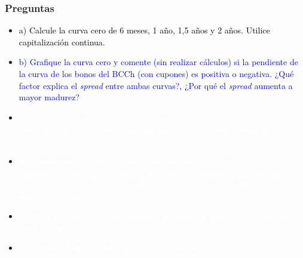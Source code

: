 \documentclass{beamer}
\begin{document}
\begin{frame}
  \frametitle{Preguntas}
  \begin{itemize}
    \scriptsize
    \item {\textcolor{black}{a) Calcule la curva cero de 6 meses, 1 año, 1,5 años y 2 años. Utilice capitalización continua.}}
    \vspace{3pt}
    \item {\Large\textcolor{blue}{b) Grafique la curva cero y comente (sin realizar cálculos) 
    si la pendiente de la curva de los bonos del BCCh (con cupones) es positiva o negativa. 
    ¿Qué factor explica el \textit{spread} entre ambas curvas?, ¿Por qué el \textit{spread} 
    aumenta a mayor madurez?}}
    \vspace{3pt}
    \item {\textcolor{white}{c) Comente cuál es la interpretación económica detrás de la pendiente observada en la curva cero. ¿Qué nos dice respecto a la probabilidad de recesión?}}
    \vspace{3pt}
    \item {\textcolor{white}{d) Considerando que usted tiene la información de la curva cero, la curva \textit{forward} y la curva de las \textit{yields} de los bonos de gobierno. Señale qué curva usaría para calcular el valor presente de las ganancias o pérdidas de los contratos \textit{forward}.}}
    \vspace{3pt}
    \item {\textcolor{white}{e) ¿Cuál es el rol de las probabilidades neutrales al riesgo en d)?, ¿Qué rol juega la condición de no arbitraje?}}
    \vspace{3pt}
    \item {\textcolor{white}{f) Calcule el punto a) utilizando matrices en Excel/R/Python.}}
    \vspace{3pt}
  \end{itemize}
\end{frame}

\pgfmathsetmacro{\fwdseisuno}{(\paii*\Tuno - \pai*\Tseis)/(\Tuno - \Tseis)}
\pgfmathsetmacro{\fwdunounocinco}{(\paiii*\TunoCinco - \paii*\Tuno)/(\TunoCinco - \Tuno)}
\pgfmathsetmacro{\fwdunocincoDos}{(\paiv*\Tdos - \paiii*\TunoCinco)/(\Tdos - \TunoCinco)}
\end{document}
